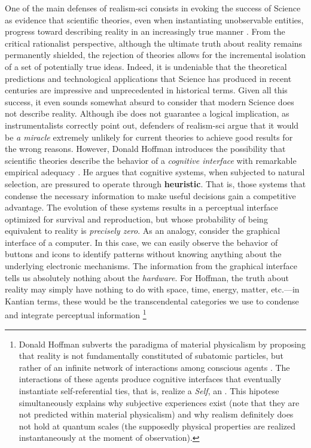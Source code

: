\documentclass[./main_en.tex]{subfiles}
\begin{document}
\par One of the main defenses of \gls{realism-sci} consists in evoking the success of Science as evidence that scientific theories, even when instantiating unobservable entities, progress toward describing reality in an increasingly true manner \cite{saatsi2017}. From the critical rationalist perspective, although the ultimate truth about reality remains permanently shielded, the rejection of theories allows for the incremental isolation of a set of potentially true ideas. Indeed, it is undeniable that the theoretical predictions and technological applications that Science has produced in recent centuries are impressive and unprecedented in historical terms. Given all this success, it even sounds somewhat absurd to consider that modern Science does not describe reality. Although \gls{ibe} does not guarantee a logical implication, as instrumentalists correctly point out, defenders of \gls{realism-sci} argue that it would be \textit{a miracle} extremely unlikely for current theories to achieve good results for the wrong reasons. However, Donald Hoffman introduces the possibility that scientific theories describe the behavior of a \textit{cognitive interface} with remarkable empirical adequacy \cite{Hoffman2015}. He argues that cognitive systems, when subjected to natural selection, are pressured to operate through \textbf{\gls{heuristic}}. That is, those systems that condense the necessary information to make useful decisions gain a competitive advantage. The evolution of these systems results in a perceptual interface optimized for survival and reproduction, but whose probability of being equivalent to reality is \textit{precisely zero}. As an \gls{analogy}, consider the graphical interface of a computer. In this case, we can easily observe the behavior of buttons and icons to identify patterns without knowing anything about the underlying electronic mechanisms. The information from the graphical interface tells us absolutely nothing about the \textit{hardware}. For Hoffman, the truth about reality may simply have nothing to do with space, time, energy, matter, etc.—in Kantian terms, these would be the transcendental categories we use to condense and integrate perceptual information \footnote{Donald Hoffman subverts the \gls{paradigma} of material physicalism by proposing that reality is not fundamentally constituted of subatomic particles, but rather of an infinite network of interactions among conscious agents \cite{Hoffman2023}. The interactions of these agents produce cognitive interfaces that eventually instantiate self-referential ties, that is, realize a \textit{Self}, an . This \gls{hipotese} simultaneously explains why subjective experiences exist (note that they are not predicted within material physicalism) and why \gls{realism} definitely does not hold at quantum scales (the supposedly physical properties are realized instantaneously at the moment of observation).}
\end{document}
